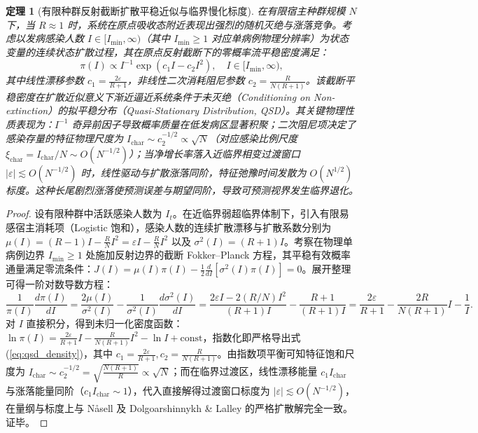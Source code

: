 \documentclass[11pt,a4paper]{article}
\theoremstyle{plain}
\newtheorem{theorem}{定理}
\theoremstyle{definition}
\begin{document}
\begin{theorem}[有限种群反射截断扩散平稳近似与临界慢化标度]\label{thm:qsd}
在有限宿主种群规模 $N$ 下，当 $R \approx 1$ 时，系统在原点吸收态附近表现出强烈的随机灭绝与涨落竞争。考虑以发病感染人数 $I \in [I_{\min}, \infty)$（其中 $I_{\min} \ge 1$ 对应单病例物理分辨率）为状态变量的连续状态扩散过程，其在原点反射截断下的零概率流平稳密度满足：
\begin{equation}
\pi(I) \propto I^{-1} \exp(c_1 I - c_2 I^2), \quad I \in [I_{\min}, \infty),
\label{eq:qsd_density}
\end{equation}
其中线性漂移参数 $c_1 = \frac{2\varepsilon}{R+1}$，非线性二次消耗阻尼参数 $c_2 = \frac{R}{N(R+1)}$。该截断平稳密度在扩散近似意义下渐近逼近系统条件于未灭绝（Conditioning on Non-extinction）的拟平稳分布（Quasi-Stationary Distribution, QSD）\citep{nasell1999quasi, dolgoarshinnykh2006critical}。其关键物理性质表现为：$I^{-1}$ 奇异前因子导致概率质量在低发病区显著积聚；二次阻尼项决定了感染存量的特征物理尺度为 $I_{\text{char}} \sim c_2^{-1/2} \propto \sqrt{N}$（对应感染比例尺度 $\xi_{\text{char}} = I_{\text{char}}/N \sim O(N^{-1/2})$）；当净增长率落入近临界相变过渡窗口 $|\varepsilon| \lesssim O(N^{-1/2})$ 时，线性驱动与扩散涨落同阶，特征弛豫时间发散为 $O(N^{1/2})$ 标度。这种长尾剧烈涨落使预测误差与期望同阶，导致可预测视界发生临界退化。
\end{theorem}

\begin{proof}
设有限种群中活跃感染人数为 $I_t$。在近临界弱超临界体制下，引入有限易感宿主消耗项（Logistic 饱和），感染人数的连续扩散漂移与扩散系数分别为 $\mu(I) = (R-1)I - \frac{R}{N}I^2 = \varepsilon I - \frac{R}{N}I^2$ 以及 $\sigma^2(I) = (R+1)I$。考察在物理单病例边界 $I_{\min} \ge 1$ 处施加反射边界的截断 Fokker--Planck 方程，其平稳有效概率通量满足零流条件：$J(I) = \mu(I)\pi(I) - \frac{1}{2}\frac{d}{dI}[\sigma^2(I)\pi(I)] = 0$。展开整理可得一阶对数导数方程：
\begin{equation}
\frac{1}{\pi(I)}\frac{d\pi(I)}{dI} = \frac{2\mu(I)}{\sigma^2(I)} - \frac{1}{\sigma^2(I)}\frac{d\sigma^2(I)}{dI} = \frac{2\varepsilon I - 2(R/N)I^2}{(R+1)I} - \frac{R+1}{(R+1)I} = \frac{2\varepsilon}{R+1} - \frac{2R}{N(R+1)}I - \frac{1}{I}.
\end{equation}
对 $I$ 直接积分，得到未归一化密度函数：$\ln \pi(I) = \frac{2\varepsilon}{R+1}I - \frac{R}{N(R+1)}I^2 - \ln I + \text{const}$，指数化即严格导出式 (\ref{eq:qsd_density})，其中 $c_1 = \frac{2\varepsilon}{R+1}, c_2 = \frac{R}{N(R+1)}$。由指数项平衡可知特征饱和尺度为 $I_{\text{char}} \sim c_2^{-1/2} = \sqrt{\frac{N(R+1)}{R}} \propto \sqrt{N}$；而在临界过渡区，线性漂移能量 $c_1 I_{\text{char}}$ 与涨落能量同阶（$c_1 I_{\text{char}} \sim 1$），代入直接解得过渡窗口标度为 $|\varepsilon| \lesssim O(N^{-1/2})$，在量纲与标度上与 N\aa sell\citep{nasell1999quasi} 及 Dolgoarshinnykh \& Lalley\citep{dolgoarshinnykh2006critical} 的严格扩散解完全一致。
证毕。
\end{proof}
\end{document}
